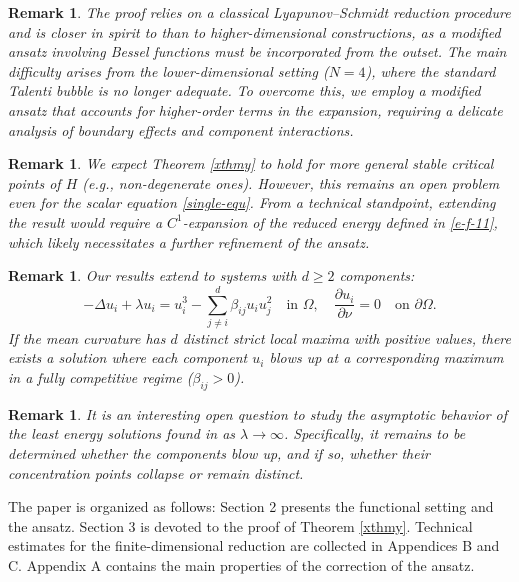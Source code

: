 \documentclass[a4paper,reqno,11pt,oneside]{amsart}
\numberwithin{equation}{section}
\newtheorem{Rem}[Thm]{Remark}
\begin{document}
\begin{Rem}\rm 
The proof relies on a classical Lyapunov--Schmidt reduction procedure and is closer in spirit to \cite{1999-REY} than to higher-dimensional constructions, as a modified ansatz involving Bessel functions must be incorporated from the outset. The main difficulty arises from the lower-dimensional setting ($N=4$), where the standard Talenti bubble is no longer adequate. To overcome this, we employ a modified ansatz that accounts for higher-order terms in the expansion, requiring a delicate analysis of boundary effects and component interactions.
\end{Rem}

\begin{Rem}\rm 
We expect Theorem \ref{xthmy} to hold for more general stable critical points of $H$ (e.g., non-degenerate ones). However, this remains an open problem even for the scalar equation \eqref{single-equ}. From a technical standpoint, extending the result would require a $C^1$-expansion of the reduced energy defined in \eqref{e-f-11}, which likely necessitates a further refinement of the ansatz.
\end{Rem}

\begin{Rem}\rm 
Our results extend to systems with $d \ge 2$ components:
$$-\Delta u_i + \lambda u_i = u_i^{3} -\sum_{j\neq i}^d \beta_{ij} u_i u_j^2 \quad \text{in } \Omega, \quad \frac{\partial u_i}{\partial \nu} = 0 \quad \text{on } \partial \Omega.$$
If the mean curvature has $d$ distinct strict local maxima with positive values, there exists a solution where each component $u_i$ blows up at a corresponding maximum in a fully competitive regime ($\beta_{ij} > 0$).
\end{Rem}

\begin{Rem}\rm 
It is an interesting open question to study the asymptotic behavior of the least energy solutions found in \cite[Theorem 1.5]{arxiv-2025} as $\lambda \to \infty$. Specifically, it remains to be determined whether the components blow up, and if so, whether their concentration points collapse or remain distinct.
\end{Rem}

\medskip
The paper is organized as follows: Section 2 presents the functional setting and the ansatz. Section 3 is devoted to the proof of Theorem \ref{xthmy}. Technical estimates for the finite-dimensional reduction are collected in Appendices B and C. Appendix A contains the main properties of the correction of the ansatz.
\end{document}

